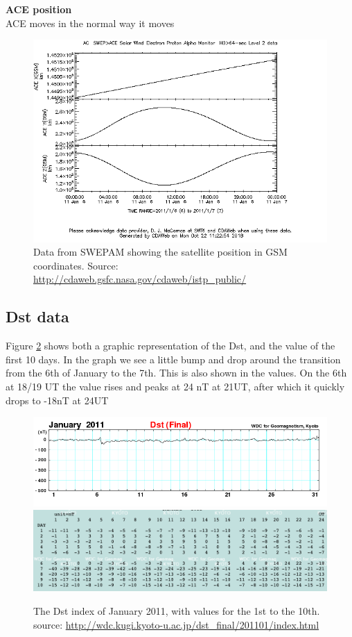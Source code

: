 \documentclass[norsk,a4paper,11pt]{article}
\begin{document}
\begin{multicols}{2}
\textbf{ACE position}\\
ACE moves in the normal way it moves
\begin{figure}[H]
	\includegraphics[scale=0.4]{Figures/ACE_positionGSM.png}
	\centering
	\caption{Data from SWEPAM showing the satellite position in GSM coordinates. Source: \url{http://cdaweb.gsfc.nasa.gov/cdaweb/istp_public/}}
	\label{fig:ACE_pos}
\end{figure}



\subsection{Dst data} %
\label{sub:dst_data}

Figure \ref{fig:Dst} shows both a graphic representation of the Dst, and the value of the first 10 days. In the graph we see a little bump and drop around the transition from the 6th of January to the 7th. This is also shown in the values. On the 6th at 18/19 UT the value rises and peaks at 24 nT at 21UT, after which it quickly drops to -18nT at 24UT
\begin{figure}[H]
	\includegraphics[scale=0.3]{Figures/dst1101.png}
	\includegraphics[scale=0.3]{Figures/dst_january.png}
	\centering
	\caption{The Dst index of January 2011, with values for the 1st to the 10th. source: \url{http://wdc.kugi.kyoto-u.ac.jp/dst_final/201101/index.html}}
	\label{fig:Dst}
\end{figure}


\end{multicols}
\end{document}
